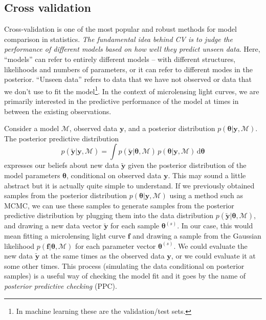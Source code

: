 \documentclass[12pt,dvipsnames]{report}
\newcommand{\ud}{\,\mathrm{d}}
\renewcommand{\vec}[1]{\boldsymbol{\mathbf{#1}}}
\begin{document}
\subsection{Cross validation}
Cross-validation is one of the most popular and robust methods for model comparison 
in statistics.
\emph{The fundamental idea behind CV is to judge the performance 
of different models based on how well they predict unseen data}. Here, ``models'' 
can refer to entirely different models -- with 
different structures, likelihoods and numbers of parameters, or it can 
refer to different modes in the posterior. ``Unseen data'' refers to data that we 
have not observed or data that we don't use to fit the model\footnote{In machine 
learning these are the validation/test sets.}. In the context of microlensing light 
curves, we are primarily interested in the predictive performance of the model at 
times in between the existing observations.

Consider a model $\mathcal{M}$, observed
data $\vec y$, and a posterior distribution $p(\vec \theta \vert \vec y,\mathcal{M})$.
The posterior predictive distribution 
\begin{equation}
p(\tilde{\vec y}|\vec y,\mathcal{M})=\int p(\tilde{\vec y}|\vec \theta,\mathcal{M})\,p(\vec \theta|\vec y,\mathcal{M})\ud\vec \theta
\end{equation}
expresses our beliefs about new data $\tilde{\vec y}$ given the posterior distribution
of the model parameters $\vec\theta$, conditional on observed data $\vec y$.
This may sound a little abstract but it is actually quite simple to understand.
If we previously obtained samples from the posterior distribution 
$p(\vec \theta \vert \vec y,\mathcal{M})$ using a method such as MCMC, we can use 
these samples to generate samples from the posterior predictive distribution by 
plugging them into the data distribution $p(\tilde{\vec y}|\vec \theta,\mathcal{M})$,
and drawing a new data vector $\tilde{\vec y}$ for each sample $\vec \theta^{(s)}$. 
In our case, this would mean fitting a microlensing light curve $\vec f$ and drawing 
a sample from the Gaussian likelihood $p(\vec f|\vec \theta,\mathcal{M})$ for each 
parameter vector $\vec \theta^{(s)}$. 
We could evaluate the new data $\tilde{\vec y}$ at the same times as the 
observed data $\vec y$, or we could evaluate it at some other times. This 
process (simulating the data conditional on posterior samples) is a useful
way of checking the model fit and it goes by the name of \emph{posterior predictive
checking} (PPC).
\end{document}
